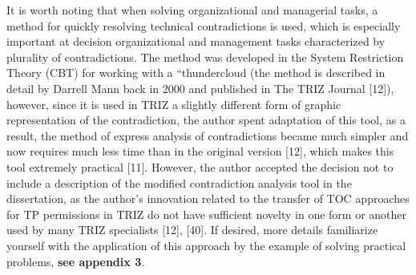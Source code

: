 It is worth noting that when solving organizational and managerial tasks, a
method for quickly resolving technical contradictions is used, which is
especially important at decision organizational and management tasks
characterized by plurality of contradictions. The method was developed in the
System Restriction Theory (CBT) for working with a “thundercloud (the method
is described in detail by Darrell Mann back in 2000 and published in The TRIZ
Journal [12]), however, since it is used in TRIZ a slightly different form of
graphic representation of the contradiction, the author spent adaptation of
this tool, as a result, the method of express analysis of contradictions
became much simpler and now requires much less time than in the original
version [12], which makes this tool extremely practical [11]. However, the
author accepted the decision not to include a description of the modified
contradiction analysis tool in the dissertation, as the author’s innovation
related to the transfer of TOC approaches for TP permissions in TRIZ do not
have sufficient novelty in one form or another used by many TRIZ specialists
[12], [40]. If desired, more details familiarize yourself with the application
of this approach by the example of solving practical problems, \textbf{see
  appendix 3}.

